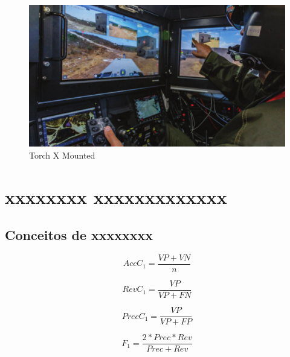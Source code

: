\lipsum[26]

\begin{figure}[!h]
    \centering
    \includegraphics[width=1\linewidth]{img/torchx_mounted}
    \caption{Torch X Mounted}
    \label{fig:torchxmounted}
\end{figure}

\lipsum[27]

\section{xxxxxxxx xxxxxxxxxxxxx}

\subsection{Conceitos de xxxxxxxx}

\lipsum[25-30]

\begin{equation}
    \label{math:acuracia}
    AccC_1 = \frac{VP + VN}{n}
\end{equation}


\begin{equation}
    \label{math:abrangencia}
    RevC_1 = \frac{VP}{VP+FN}
\end{equation}



\begin{equation}
    \label{math:precisao}
    PrecC_1 = \frac{VP}{VP+FP}
\end{equation}


\begin{equation}
    \label{math:f1}
    F_1 = \frac{2*Prec*Rev}{Prec + Rev}
\end{equation}

\lipsum[31]

